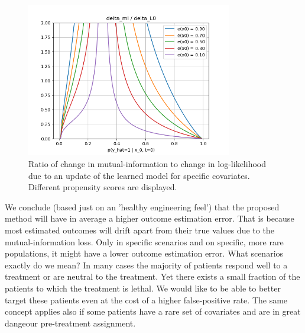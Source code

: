 \documentclass[oneside,12pt]{article}
\begin{document}
%
\begin{figure}
    \centering
        \includegraphics[width=0.8\textwidth]{./deltaLl_vs_deltaMi}
        \caption{\label{fig:deltaLl_vs_deltaMi}Ratio of change in mutual-information to change in log-likelihood due to an update of the learned model for specific covariates. Different propensity scores are displayed.}
\end{figure}
%
We conclude (based just on an 'healthy engineering feel') that the proposed method will have in average a higher outcome estimation error. That is because most estimated outcomes will drift apart from their true values due to the mutual-information loss. Only in specific scenarios and on specific, more rare populations, it might have a lower outcome estimation error. What scenarios exactly do we mean? In many cases the majority of patients respond well to a treatment or are neutral to the treatment. Yet there exists a small fraction of the patients to which the treatment is lethal. We would like to be able to better target these patients even at the cost of a higher false-positive rate. The same concept applies also if some patients have a rare set of covariates and are in great dangeour pre-treatment assignment. 
%
\end{document}
